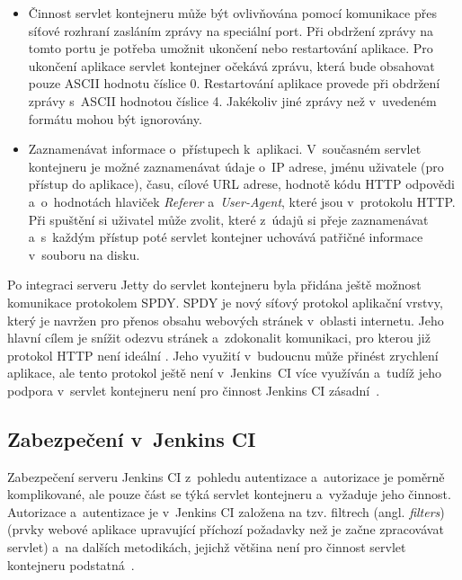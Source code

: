 \begin{itemize}
                \item Činnost servlet kontejneru může být ovlivňována pomocí komunikace přes síťové rozhraní zasláním zprávy
                    na speciální port. Při obdržení zprávy na tomto portu je potřeba umožnit ukončení nebo restartování aplikace.
                    Pro ukončení aplikace servlet kontejner očekává zprávu, která bude obsahovat pouze ASCII hodnotu číslice 0.
                    Restartování aplikace provede při obdržení zprávy s~ASCII hodnotou číslice 4. Jakékoliv
                    jiné zprávy než v~uvedeném formátu mohou být ignorovány.

                \item Zaznamenávat informace o~přístupech k~aplikaci. V~současném servlet kontejneru je možné zaznamenávat
                    údaje o~IP adrese, jménu uživatele (pro přístup do aplikace), času, cílové URL adrese, hodnotě 
                    kódu HTTP odpovědi a~o~hodnotách hlaviček \emph{Referer} a~\emph{User-Agent}, které jsou v~protokolu HTTP.
                    Při spuštění si uživatel může zvolit, které z~údajů si přeje zaznamenávat a~s~každým přístup poté 
                    servlet kontejner uchovává patřičné informace v~souboru na disku.

            \end{itemize}
            

            Po integraci serveru Jetty do servlet kontejneru byla přidána ještě možnost
            komunikace protokolem SPDY. SPDY je nový síťový protokol aplikační vrstvy, který je
            navržen pro přenos obsahu webových stránek v~oblasti internetu. Jeho hlavní cílem je snížit odezvu stránek a~zdokonalit
            komunikaci, pro kterou již protokol HTTP není ideální \cite{spdyArticle}.
            Jeho využití v~budoucnu může přinést zrychlení aplikace, ale 
            tento protokol ještě není 
            v~Jenkins~CI více využíván a~tudíž jeho podpora v~servlet kontejneru není pro činnost Jenkins CI zásadní~\cite{kohsukeTopic}.
        
        \subsection{Zabezpečení v~Jenkins CI} \label{secSecurityArchitecture}
            Zabezpečení serveru Jenkins CI z~pohledu autentizace a~autorizace je poměrně komplikované,
            ale pouze část se týká servlet kontejneru a~vyžaduje jeho činnost. 
            Autorizace a~autentizace je v~Jenkins CI založena na tzv. filtrech (angl. \emph{filters})
            (prvky webové aplikace upravující příchozí požadavky než je začne zpracovávat servlet) 
            a~na dalších metodikách, jejichž většina není pro činnost servlet kontejneru podstatná~\cite{securityArchitectureJenkins}. 
            
